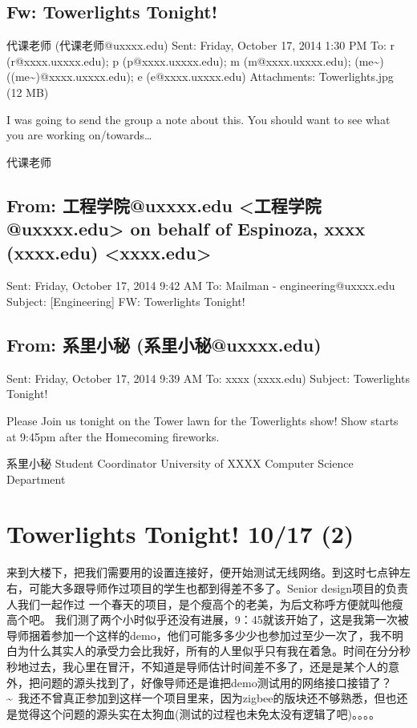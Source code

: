 \documentclass[12pt]{book}
\begin{document}
\subsection{Fw: Towerlights Tonight!}
\label{sec-16-1-1}
代课老师 (代课老师@uxxxx.edu)
Sent:        Friday, October 17, 2014 1:30 PM
To:        
r (r@xxxx.uxxxx.edu); p (p@xxxx.uxxxx.edu); m (m@xxxx.uxxxx.edu); (me\textasciitilde{}) ((me\textasciitilde{})@xxxx.uxxxx.edu); e (e@xxxx.uxxxx.edu)
Attachments:        
Towerlights.jpg‎ (12 MB‎)

I was going to send the group a note about this.  You should want to see what you
are working on/towards\ldots{}

代课老师

\subsection{From: 工程学院@uxxxx.edu <工程学院@uxxxx.edu> on behalf of Espinoza, xxxx (xxxx.edu) <xxxx.edu>}
\label{sec-16-1-2}
Sent: Friday, October 17, 2014 9:42 AM
To: Mailman - engineering@uxxxx.edu
Subject: [Engineering] FW: Towerlights Tonight!

\subsection{From: 系里小秘 (系里小秘@uxxxx.edu)}
\label{sec-16-1-3}
Sent: Friday, October 17, 2014 9:39 AM
To: xxxx (xxxx.edu)
Subject: Towerlights Tonight!

Please Join us tonight on the Tower lawn for the Towerlights show! Show starts at 9:45pm after the Homecoming fireworks.

系里小秘
Student Coordinator
University of XXXX
Computer Science Department

\section{Towerlights Tonight! 10/17 (2)}
\label{sec-16-2}
来到大楼下，把我们需要用的设置连接好，便开始测试无线网络。到这时七点钟左右，可能大多跟导师作过项目的学生也都到得差不多了。Senior design项目的负责人我们一起作过 一个春天的项目，是个瘦高个的老美，为后文称呼方便就叫他瘦高个吧。 我们测了两个小时似乎还没有进展，9：45就该开始了，这是我第一次被导师捆着参加一个这样的demo，他们可能多多少少也参加过至少一次了，我不明白为什么其实人的承受力会比我好，所有的人里似乎只有我在着急。时间在分分秒秒地过去，我心里在冒汗，不知道是导师估计时间差不多了，还是是某个人的意外，把问题的源头找到了，好像导师还是谁把demo测试用的网络接口接错了？\textasciitilde{}~我还不曾真正参加到这样一个项目里来，因为zigbee的版块还不够熟悉，但也还是觉得这个问题的源头实在太狗血(测试的过程也未免太没有逻辑了吧)。。。。
\end{document}
